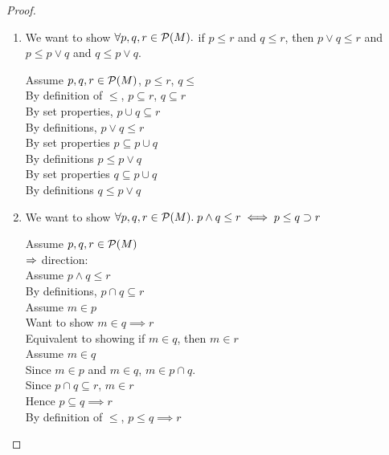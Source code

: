 \begin{proof}
\begin{enumerate}
\item We want to show $\forall p,q,r \in \mathcal{P}(M).$ if $p \leq r$ and $q \leq r$, then
      $p \vee q \leq r$ and
      $p \leq p \vee q$ and $q \leq p \vee q$.

  \begin{tabbedproof}
    Assume $p, q, r \in \mathcal{P}(M)$, $p \leq r$, $q \leq $ \\[1em]
    \oo By definition of $\leq$, $p \subseteq r$, $q \subseteq r$ \\
    \oo By set properties, $p \cup q \subseteq r$ \\
    \oo By definitions, $p \vee q \leq r$ \\[1em]

    \oo By set properties $p \subseteq p \cup q$ \\
    \oo By definitions $p \leq p \vee q$ \\[1em]
  
    \oo By set properties $q \subseteq p \cup q$ \\
    \oo By definitions $q \leq p \vee q$ \\
  \end{tabbedproof}

\item We want to show $\forall p, q, r \in \mathcal{P}(M).\; p \land q \leq r \iff p \leq q \supset r$

  \begin{tabbedproof}
    Assume $p,q,r \in \mathcal{P}(M)$ \\[1em]

    $\Rightarrow$ direction: \\
    \oo Assume $p \land q \leq r$ \\
    \ooo By definitions, $p \cap q \subseteq r$ \\
    \ooo Assume $m \in p$ \\
    \oooo Want to show $m \in q \implies r$ \\
    \oooo Equivalent to showing if $m \in q$, then $m \in r$ \\
    \oooo Assume $m \in q$ \\
    \ooooo Since $m \in p$ and $m \in q$, $m \in p \cap q$. \\
    \ooooo Since $p \cap q \subseteq r$, $m \in r$ \\
    \ooo Hence $p \subseteq q \implies r$ \\
    \ooo By definition of $\leq$, $p \leq q \implies r$ \\[1em]


\end{tabbedproof}
\end{enumerate}
\end{proof}
